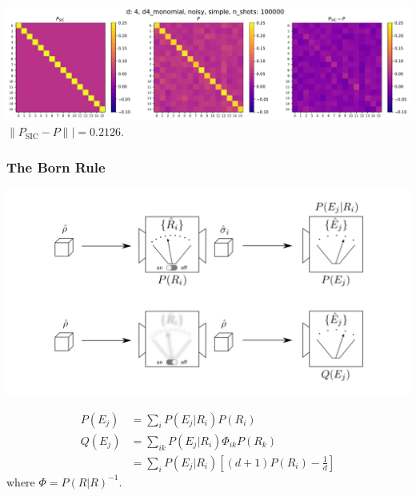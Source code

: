 \documentclass{beamer}
\begin{document}
\begin{frame}
\begin{center}
\includegraphics[scale=0.3]{img/P_d4_d4_monomial_noisy_simple_n100000}	
 $\lVert P_{\text{SIC}}-P\rVert|=0.2126$.
\end{center}
	
\end{frame}


\begin{frame}
\frametitle{The Born Rule}
\vspace{-2em}
\begin{center}
\includegraphics[scale=0.45]{img/sky_ground}	
\end{center}
\vspace{-2em}
\begin{small}
\begin{align}
P(E_j) &= \sum_i P(E_j|R_i)P(R_i)\\
Q(E_j) &= \sum_{ik} P(E_j|R_i)\Phi_{ik}P(R_k)\\
&=\sum_{i} P(E_j|R_i)\left[(d+1)P(R_i)-\frac{1}{d}\right]
\end{align}
where $\Phi = P(R|R)^{-1}$.
\end{small}
\end{frame}
\end{document}

